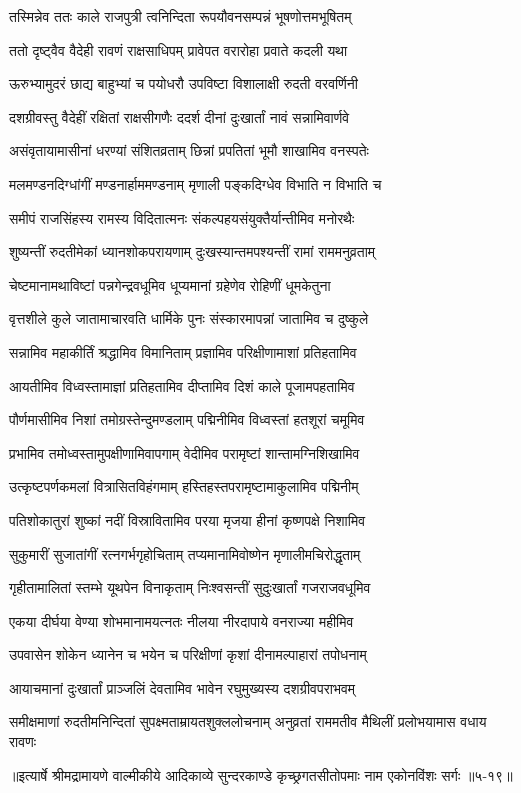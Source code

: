 
\twolineshloka
{तस्मिन्नेव ततः काले राजपुत्री त्वनिन्दिता}
{रूपयौवनसम्पन्नं भूषणोत्तमभूषितम्} %

\twolineshloka
{ततो दृष्ट्वैव वैदेही रावणं राक्षसाधिपम्}
{प्रावेपत वरारोहा प्रवाते कदली यथा} %

\twolineshloka
{ऊरुभ्यामुदरं छाद्य बाहुभ्यां च पयोधरौ}
{उपविष्टा विशालाक्षी रुदती वरवर्णिनी} %

\twolineshloka
{दशग्रीवस्तु वैदेहीं रक्षितां राक्षसीगणैः}
{ददर्श दीनां दुःखार्तां नावं सन्नामिवार्णवे} %

\twolineshloka
{असंवृतायामासीनां धरण्यां संशितव्रताम्}
{छिन्नां प्रपतितां भूमौ शाखामिव वनस्पतेः} %

\twolineshloka
{मलमण्डनदिग्धांगीं मण्डनार्हाममण्डनाम्}
{मृणाली पङ्कदिग्धेव विभाति न विभाति च} %

\twolineshloka
{समीपं राजसिंहस्य रामस्य विदितात्मनः}
{संकल्पहयसंयुक्तैर्यान्तीमिव मनोरथैः} %

\twolineshloka
{शुष्यन्तीं रुदतीमेकां ध्यानशोकपरायणाम्}
{दुःखस्यान्तमपश्यन्तीं रामां राममनुव्रताम्} %

\twolineshloka
{चेष्टमानामथाविष्टां पन्नगेन्द्रवधूमिव}
{धूप्यमानां ग्रहेणेव रोहिणीं धूमकेतुना} %

\twolineshloka
{वृत्तशीले कुले जातामाचारवति धार्मिके}
{पुनः संस्कारमापन्नां जातामिव च दुष्कुले} %

\twolineshloka
{सन्नामिव महाकीर्तिं श्रद्धामिव विमानिताम्}
{प्रज्ञामिव परिक्षीणामाशां प्रतिहतामिव} %

\twolineshloka
{आयतीमिव विध्वस्तामाज्ञां प्रतिहतामिव}
{दीप्तामिव दिशं काले पूजामपहतामिव} %

\twolineshloka
{पौर्णमासीमिव निशां तमोग्रस्तेन्दुमण्डलाम्}
{पद्मिनीमिव विध्वस्तां हतशूरां चमूमिव} %

\twolineshloka
{प्रभामिव तमोध्वस्तामुपक्षीणामिवापगाम्}
{वेदीमिव परामृष्टां शान्तामग्निशिखामिव} %

\twolineshloka
{उत्कृष्टपर्णकमलां वित्रासितविहंगमाम्}
{हस्तिहस्तपरामृष्टामाकुलामिव पद्मिनीम्} %

\twolineshloka
{पतिशोकातुरां शुष्कां नदीं विस्रावितामिव}
{परया मृजया हीनां कृष्णपक्षे निशामिव} %

\twolineshloka
{सुकुमारीं सुजातांगीं रत्नगर्भगृहोचिताम्}
{तप्यमानामिवोष्णेन मृणालीमचिरोद्धृताम्} %

\twolineshloka
{गृहीतामालितां स्तम्भे यूथपेन विनाकृताम्}
{निःश्वसन्तीं सुदुःखार्तां गजराजवधूमिव} %

\twolineshloka
{एकया दीर्घया वेण्या शोभमानामयत्नतः}
{नीलया नीरदापाये वनराज्या महीमिव} %

\twolineshloka
{उपवासेन शोकेन ध्यानेन च भयेन च}
{परिक्षीणां कृशां दीनामल्पाहारां तपोधनाम्} %

\twolineshloka
{आयाचमानां दुःखार्तां प्राञ्जलिं देवतामिव}
{भावेन रघुमुख्यस्य दशग्रीवपराभवम्} %

\twolineshloka
{समीक्षमाणां रुदतीमनिन्दितां सुपक्ष्मताम्रायतशुक्ललोचनाम्}
{अनुव्रतां राममतीव मैथिलीं प्रलोभयामास वधाय रावणः} %


॥इत्यार्षे श्रीमद्रामायणे वाल्मीकीये आदिकाव्ये सुन्दरकाण्डे कृच्छ्रगतसीतोपमाः नाम एकोनविंशः सर्गः ॥५-१९॥
